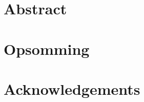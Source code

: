 \TitlePage

\DeclarationPage

\chapter{Abstract}
\newpage

\chapter{Opsomming}
\newpage

\chapter{Acknowledgements}
\newpage

\setcounter{secnumdepth}{2}
\setcounter{tocdepth}{1}

\tableofcontents
\newpage

\listoffigures
\newpage

\listoftables
\newpage